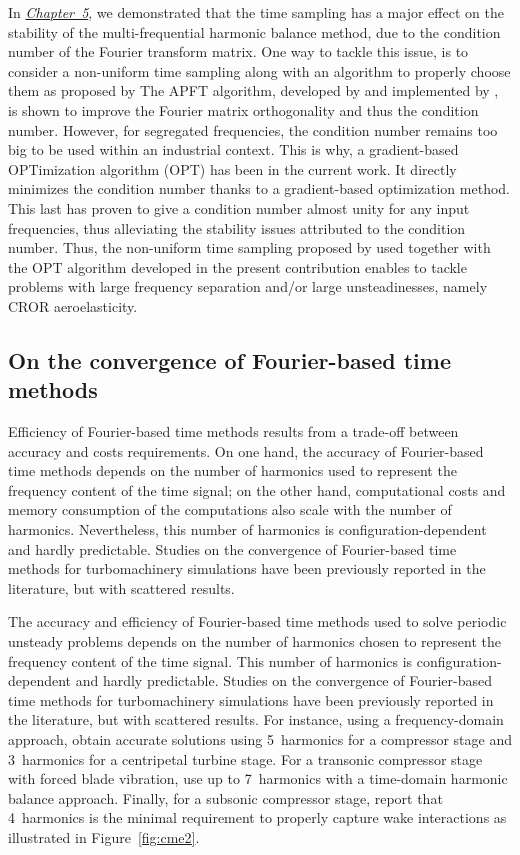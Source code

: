 In \hyperref[cha:limitations_condition_number]{\emph{Chapter~5}},
we demonstrated that the time sampling has a major effect on the
stability of the multi-frequential harmonic balance 
method, due to the condition number of the Fourier
transform matrix. One way to tackle this issue, 
is to consider a non-uniform time sampling
along with an algorithm to properly choose them
as proposed by \citet{ThesisGuedeney}
The APFT algorithm, developed
by \citet{Kundert1988} and implemented by 
\citet{ThesisGuedeney}, is shown to improve the
Fourier matrix orthogonality and thus the condition number.
However, for segregated frequencies, the condition number
remains too big to be used within an industrial context.
This is why, a gradient-based OPTimization algorithm (OPT) 
has been in the current work.
It directly minimizes the condition number thanks to a
gradient-based optimization method. This last has proven to
give a condition number almost unity for any input frequencies,
thus alleviating the stability issues attributed to 
the condition number.
Thus, the non-uniform time sampling proposed by \citet{ThesisGuedeney}
used together with the OPT algorithm 
developed in the present contribution
enables to tackle problems with large frequency 
separation and/or large unsteadinesses, namely CROR aeroelasticity.

\subsection*{On the convergence of Fourier-based time methods}

Efficiency of Fourier-based time methods results 
from a trade-off between accuracy and 
costs requirements.
On one hand, the accuracy of Fourier-based
time methods depends on the number of harmonics
used to represent the frequency content of the time 
signal; on the other hand, computational costs and 
memory consumption of the computations also scale
with the number of harmonics. 
Nevertheless, this number of harmonics is configuration-dependent 
and hardly predictable. Studies on the convergence of 
Fourier-based time methods for turbomachinery simulations 
have been previously reported in the literature, 
but with scattered results. 

The accuracy and efficiency of Fourier-based time methods 
used to solve periodic unsteady problems depends on the number of harmonics
chosen to represent the frequency content of the time signal.
This number of harmonics is configuration-dependent 
and hardly predictable. Studies on the convergence of 
Fourier-based time methods for turbomachinery simulations 
have been previously reported in the literature, 
but with scattered results. 
For instance, using a frequency-domain approach, 
\citet{Vilmin2006} obtain accurate solutions 
using 5~harmonics for a compressor stage and 3~harmonics for a 
centripetal turbine stage. For a transonic compressor stage with 
forced blade vibration, \citet{ekici2010} use 
up to 7~harmonics with a time-domain harmonic balance approach. Finally, for a 
subsonic compressor stage, \citet{Sicot2012} report 
that 4~harmonics is the minimal requirement to properly capture wake interactions
as illustrated in Figure~\ref{fig:cme2}. 

